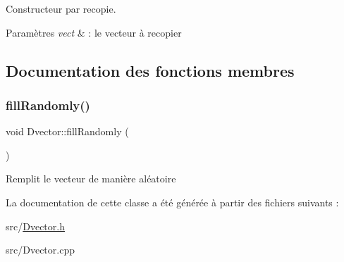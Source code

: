 Constructeur par recopie. 


\begin{DoxyParams}{Paramètres}
{\em vect} & \+: le vecteur à recopier \\
\hline
\end{DoxyParams}


\subsection{Documentation des fonctions membres}
\mbox{\label{class_dvector_a6fecdca0fbad7f928403597e322234b1}} 
\subsubsection{\texorpdfstring{fill\+Randomly()}{fillRandomly()}}
{\footnotesize\ttfamily void Dvector\+::fill\+Randomly (\begin{DoxyParamCaption}{ }\end{DoxyParamCaption})}

Remplit le vecteur de manière aléatoire 

La documentation de cette classe a été générée à partir des fichiers suivants \+:\begin{DoxyCompactItemize}
\item 
src/\hyperlink{_dvector_8h}{Dvector.\+h}\item 
src/Dvector.\+cpp\end{DoxyCompactItemize}
